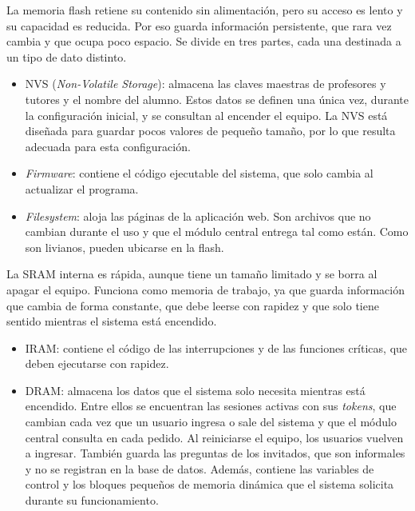 La memoria flash retiene su contenido sin alimentación, pero su acceso es lento y su capacidad es reducida. Por eso guarda información persistente, que rara vez cambia y que ocupa poco espacio. Se divide en tres partes, cada una destinada a un tipo de dato distinto.

\begin{itemize}

\item NVS (\emph{Non-Volatile Storage}): almacena las claves maestras de profesores y tutores y el nombre del alumno. Estos datos se definen una única vez, durante la configuración inicial, y se consultan al encender el equipo. La NVS está diseñada para guardar pocos valores de pequeño tamaño, por lo que resulta adecuada para esta configuración.

\item \emph{Firmware}: contiene el código ejecutable del sistema, que solo cambia al actualizar el programa.

\item \emph{Filesystem}: aloja las páginas de la aplicación web. Son archivos que no cambian durante el uso y que el módulo central entrega tal como están. Como son livianos, pueden ubicarse en la flash.

\end{itemize}


La SRAM interna es rápida, aunque tiene un tamaño limitado y se borra al apagar el equipo. Funciona como memoria de trabajo, ya que guarda información que cambia de forma constante, que debe leerse con rapidez y que solo tiene sentido mientras el sistema está encendido.

\begin{itemize}

\item IRAM: contiene el código de las interrupciones y de las funciones críticas, que deben ejecutarse con rapidez.

\item DRAM: almacena los datos que el sistema solo necesita mientras está encendido. Entre ellos se encuentran las sesiones activas con sus \emph{tokens}, que cambian cada vez que un usuario ingresa o sale del sistema y que el módulo central consulta en cada pedido. Al reiniciarse el equipo, los usuarios vuelven a ingresar. También guarda las preguntas de los invitados, que son informales y no se registran en la base de datos. Además, contiene las variables de control y los bloques pequeños de memoria dinámica que el sistema solicita durante su funcionamiento.

\end{itemize}

